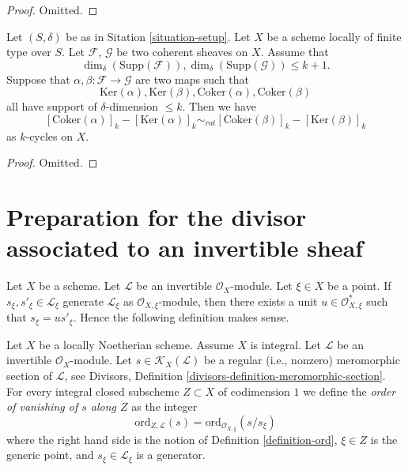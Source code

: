 \begin{proof}
Omitted.
\end{proof}

\begin{lemma}
\label{lemma-maps-between-coherent-sheaves}
Let $(S, \delta)$ be as in Sitation \ref{situation-setup}.
Let $X$ be a scheme locally of finite type over $S$.
Let $\mathcal{F}$, $\mathcal{G}$ be two coherent sheaves on $X$.
Assume that
$$
\dim_\delta(\text{Supp}(\mathcal{F})),
\dim_\delta(\text{Supp}(\mathcal{G}))
\leq
k + 1.
$$
Suppose that $\alpha, \beta : \mathcal{F} \to \mathcal{G}$
are two maps such that
$$
\text{Ker}(\alpha),
\text{Ker}(\beta),
\text{Coker}(\alpha),
\text{Coker}(\beta)
$$
all have support of $\delta$-dimension $\leq k$.
Then we have
$$
[\text{Coker}(\alpha)]_k - [\text{Ker}(\alpha)]_k
\sim_{rat}
[\text{Coker}(\beta)]_k - [\text{Ker}(\beta)]_k
$$
as $k$-cycles on $X$.
\end{lemma}

\begin{proof}
Omitted.
\end{proof}








\section{Preparation for the divisor associated to an invertible sheaf}
\label{section-preparation-divisor-sheaf}

\noindent
Let $X$ be a scheme.
Let $\mathcal{L}$ be an invertible $\mathcal{O}_X$-module.
Let $\xi \in X$ be a point.
If $s_\xi, s'_\xi \in \mathcal{L}_\xi$ generate $\mathcal{L}_\xi$
as $\mathcal{O}_{X, \xi}$-module, then there exists a unit
$u \in \mathcal{O}_{X, \xi}^*$ such that $s_\xi = u s'_\xi$.
Hence the following definition makes sense.

\begin{definition}
\label{definition-order-vanishing-meromorphic}
Let $X$ be a locally Noetherian scheme. Assume $X$ is integral.
Let $\mathcal{L}$ be an invertible $\mathcal{O}_X$-module.
Let $s \in \mathcal{K}_X(\mathcal{L})$ be a regular (i.e., nonzero)
meromorphic section of $\mathcal{L}$, see
Divisors, Definition \ref{divisors-definition-meromorphic-section}.
For every integral closed subscheme
$Z \subset X$ of codimension $1$ we define
the {\it order of vanishing of $s$ along $Z$} as the integer
$$
\text{ord}_{Z, \mathcal{L}}(s)
= \text{ord}_{\mathcal{O}_{X, \xi}}(s/s_\xi)
$$
where the right hand side is the notion of
Definition \ref{definition-ord}, $\xi \in Z$ is the generic point,
and $s_\xi \in \mathcal{L}_\xi$ is a generator.
\end{definition}

